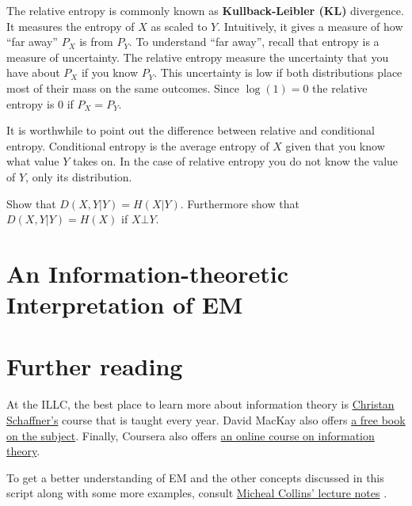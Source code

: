 The relative entropy is commonly known as \textbf{Kullback-Leibler (KL)} divergence. It measures the entropy of $ X $ as scaled to $ Y $. Intuitively,
it gives a measure of how ``far away'' $ P_{X} $ is from $ P_{Y} $. To understand ``far away'', recall that entropy is a measure of uncertainty. The
relative entropy measure the uncertainty that you have about $ P_{X} $ if you know $ P_{Y} $. This uncertainty is low if both distributions place most
of their mass on the same outcomes. Since $ \log(1) = 0 $ the relative entropy is 0 if $ P_{X} = P_{Y} $.

It is worthwhile to point out the difference between relative and conditional entropy. Conditional entropy is the average entropy of $ X $ given that you
know what value $ Y $ takes on. In the case of relative entropy you do not know the value of $ Y $, only its distribution.

\begin{Exercise}
 Show that $ D(X,Y|Y) = H(X|Y) $. Furthermore show that $ D(X,Y|Y) = H(X) $ if $ X\bot Y $.
\end{Exercise}

\section{An Information-theoretic Interpretation of EM}

\section*{Further reading}

At the ILLC, the best place to learn more about information theory is \href{http://homepages.cwi.nl/~schaffne/courses/inftheory/2015/}{Christan Schaffner's}
course that is taught every year. David MacKay also offers \href{http://www.inference.phy.cam.ac.uk/itprnn/book.pdf}{a free book on the subject}. Finally,
Coursera also offers \href{https://www.coursera.org/course/informationtheory}{an online course on information theory}.

To get a better understanding of EM and the other concepts discussed in this script along with some more examples, consult 
\href{http://www.cs.columbia.edu/~mcollins/em.pdf}{Micheal Collins' lecture notes} .





